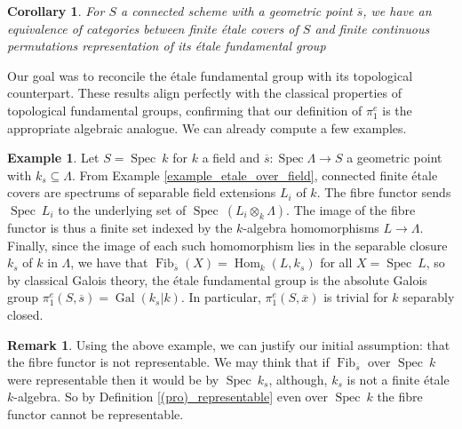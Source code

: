 \documentclass{article}
\theoremstyle{plain}
\newtheorem{corollary}[theorem]{Corollary}
\theoremstyle{definition}
\newtheorem{remark}{Remark}
\newtheorem{example}[theorem]{Example}
\DeclareMathOperator{\Hom}{Hom}
\DeclareMathOperator{\Fib}{Fib}
\DeclareMathOperator{\Spec}{Spec}
\DeclareMathOperator{\Gal}{Gal}
\begin{document}
\begin{corollary}
\label{corollary_representation}
    For $S$ a connected scheme with a geometric point $\overline{s}$, 
    we have an equivalence of categories between finite \'etale covers of $S$ 
    and finite continuous permutations representation of its \'etale fundamental group
\end{corollary}


\noindent Our goal was to reconcile the \'etale fundamental group with its topological counterpart. 
These results align perfectly with the classical properties of topological fundamental groups, confirming that our definition of $\pi_1^e$ is the appropriate algebraic analogue.
We can already compute a few examples.

\begin{example}
\label{fundamental_group_over_field}
    Let $S=\Spec\:k$ for $k$ a field and $\overline{s}:\Spec\Lambda \rightarrow S$ a geometric point with $k_s\subseteq \Lambda$.
    From Example \ref{example_etale_over_field}, connected finite \'etale covers are spectrums of separable field extensions $L_i$ of $k$.
    The fibre functor sends $\Spec\:L_i$ to the underlying set of $\Spec\:(L_i\otimes_k\Lambda)$.
    The image of the fibre functor is thus a finite set indexed by the $k$-algebra homomorphisms $L\rightarrow \Lambda$.
    Finally, since the image of each such homomorphism lies in the separable closure $k_s$ of $k$ in $\Lambda$, we have that $\Fib_{\overline{s}}(X) = \Hom_k(L,k_s)$ for all $X = \Spec\:L$, so by classical Galois theory, the \'etale fundamental group is the absolute Galois group $\pi_1^{e}(S,\overline{s}) = \Gal(k_s|k)$. 
    In particular, $\pi^e_1(S,\overline{x})$ is trivial for $k$ separably closed.
\end{example}



\begin{remark}
    Using the above example, we can justify our initial assumption: that the fibre functor is not representable. 
    We may think that if $\Fib_{\overline{s}}$ over $\Spec\: k$ were representable then it would be by $\Spec \: k_s$, although, $k_s$ is not a finite \'etale $k$-algebra. 
    So by Definition \ref{(pro)_representable} even over $\Spec\:k$ the fibre functor cannot be representable.
\end{remark}
\end{document}
